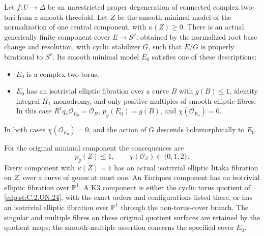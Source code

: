 
\begin{proposition}\label{cdp:st:C.2.UN.31}
Let $f:U\to\Delta$ be an unrestricted proper degeneration
of connected complex two-tori from a smooth threefold.
Let $Z$ be the smooth minimal model of the normalization
of one central component, with $\kappa(Z)\ge0$.
There is an actual generically finite component cover
$E\to S^\nu$, obtained by the normalized root base change
and resolution, with cyclic stabilizer $G$, such that
$E/G$ is properly birational to $S^\nu$. Its smooth
minimal model $E_0$ satisfies one of these descriptions:

\begin{itemize}
\item $E_0$ is a complex two-torus;
\item $E_0$ has an isotrivial elliptic fibration over a
curve $B$ with $g(B)\le1$, identity integral $H_1$
monodromy, and only positive multiples of smooth
elliptic fibres. In this case
$R^1q_*\mathcal O_{E_0}=\mathcal O_B$,
$p_g(E_0)=g(B)$, and $\chi(\mathcal O_{E_0})=0$.
\end{itemize}
In both cases $\chi(\mathcal O_{E_0})=0$, and the
action of $G$ descends holomorphically to $E_0$.

For the original minimal component the consequences are
\[
 p_g(Z)\le1,
 \qquad \chi(\mathcal O_Z)\in\{0,1,2\}.
                                                               \tag{C.CS.1}\label{cdp:eq:C.CS.1}
\]
Every component with $\kappa(Z)=1$ has an actual
isotrivial elliptic Iitaka fibration on $Z$, over a
curve of genus at most one. An Enriques component
has an isotrivial elliptic fibration over $\mathbb P^1$.
A K3 component is either the cyclic torus quotient
of \ref{cdp:st:C.2.UN.24}, with the exact orders and configurations
listed there, or has an isotrivial elliptic fibration
over $\mathbb P^1$ through the non-torus-cover branch.
The singular and multiple fibres on these original
quotient surfaces are retained by the quotient maps;
the smooth-multiple assertion concerns the specified
cover $E_0$.
\end{proposition}


